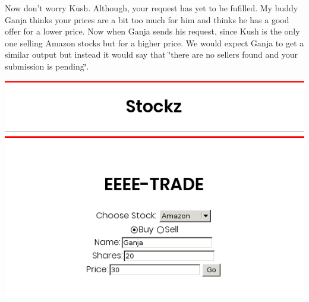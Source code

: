 Now don't worry Kush. Although, your request has yet to be fufilled. My buddy Ganja thinks your prices are a bit too much for him and thinks he has a good offer for a lower price. Now when Ganja sends his request, since Kush is the only one selling Amazon stocks but for a higher price. We would expect Ganja to get a similar output but instead it would say that \char`\"{}there are no sellers found and your submission is pending\char`\"{}.

 
\includegraphics[scale=0.5]{../test4.png}
 
